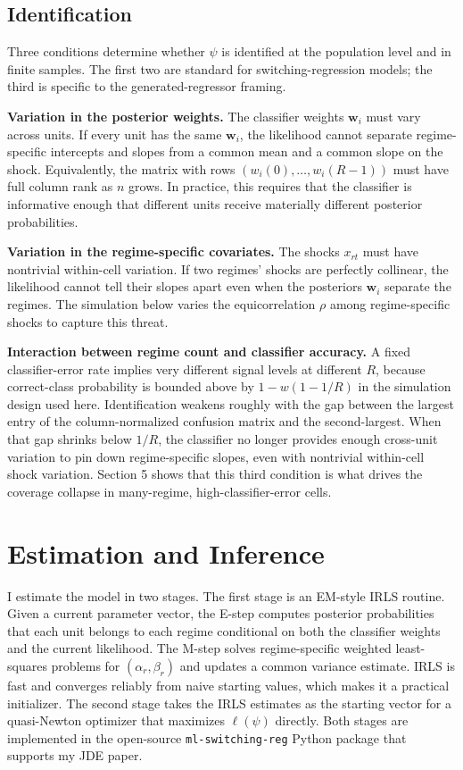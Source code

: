 \documentclass[
  12pt,
  letterpaper]{article}
\begin{document}
\subsection{Identification}\label{identification}

Three conditions determine whether \(\psi\) is identified at the
population level and in finite samples. The first two are standard for
switching-regression models; the third is specific to the
generated-regressor framing.

\textbf{Variation in the posterior weights.} The classifier weights
\(\mathbf{w}_i\) must vary across units. If every unit has the same
\(\mathbf{w}_i\), the likelihood cannot separate regime-specific
intercepts and slopes from a common mean and a common slope on the
shock. Equivalently, the matrix with rows \((w_i(0), \ldots, w_i(R-1))\)
must have full column rank as \(n\) grows. In practice, this requires
that the classifier is informative enough that different units receive
materially different posterior probabilities.

\textbf{Variation in the regime-specific covariates.} The shocks
\(x_{rt}\) must have nontrivial within-cell variation. If two regimes'
shocks are perfectly collinear, the likelihood cannot tell their slopes
apart even when the posteriors \(\mathbf{w}_i\) separate the regimes.
The simulation below varies the equicorrelation \(\rho\) among
regime-specific shocks to capture this threat.

\textbf{Interaction between regime count and classifier accuracy.} A
fixed classifier-error rate implies very different signal levels at
different \(R\), because correct-class probability is bounded above by
\(1 - w(1 - 1/R)\) in the simulation design used here. Identification
weakens roughly with the gap between the largest entry of the
column-normalized confusion matrix and the second-largest. When that gap
shrinks below \(1/R\), the classifier no longer provides enough
cross-unit variation to pin down regime-specific slopes, even with
nontrivial within-cell shock variation. Section 5 shows that this third
condition is what drives the coverage collapse in many-regime,
high-classifier-error cells.

\FloatBarrier

\section{Estimation and Inference}\label{estimation-and-inference}

I estimate the model in two stages. The first stage is an EM-style IRLS
routine. Given a current parameter vector, the E-step computes posterior
probabilities that each unit belongs to each regime conditional on both
the classifier weights and the current likelihood. The M-step solves
regime-specific weighted least-squares problems for
\((\alpha_r, \beta_r)\) and updates a common variance estimate. IRLS is
fast and converges reliably from naive starting values, which makes it a
practical initializer. The second stage takes the IRLS estimates as the
starting vector for a quasi-Newton optimizer that maximizes
\(\ell(\psi)\) directly. Both stages are implemented in the open-source
\texttt{ml-switching-reg} Python package that supports my JDE paper.
\end{document}

